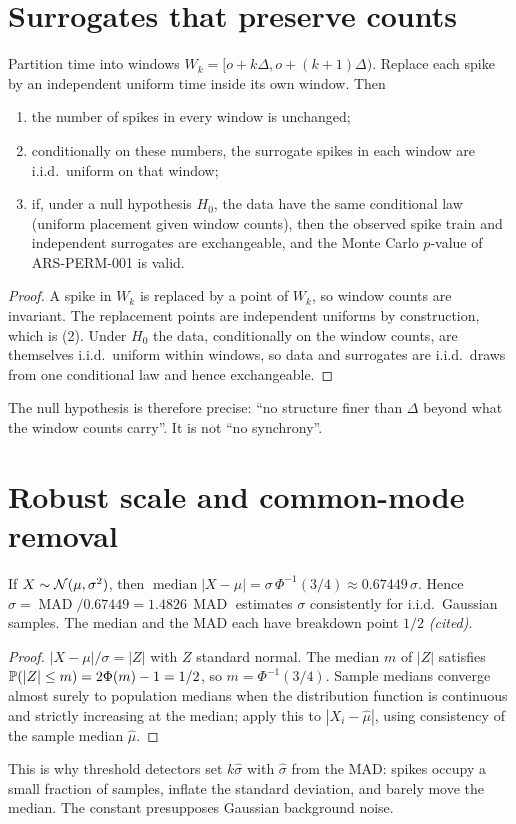 \section{Surrogates that preserve counts}
\begin{theorem}\label{ars:count-009}
Partition time into windows $W_k=[o+k\Delta,o+(k+1)\Delta)$. Replace each spike by an independent uniform time inside its own window. Then
\begin{enumerate}[leftmargin=2em]
\item the number of spikes in every window is unchanged;
\item conditionally on these numbers, the surrogate spikes in each window are i.i.d.\ uniform on that window;
\item if, under a null hypothesis $H_0$, the data have the same conditional law (uniform placement given window counts), then the observed spike train and independent surrogates are exchangeable, and the Monte Carlo $p$-value of ARS-PERM-001 is valid.
\end{enumerate}
\end{theorem}
\begin{proof}
A spike in $W_k$ is replaced by a point of $W_k$, so window counts are invariant. The replacement points are independent uniforms by construction, which is (2). Under $H_0$ the data, conditionally on the window counts, are themselves i.i.d.\ uniform within windows, so data and surrogates are i.i.d.\ draws from one conditional law and hence exchangeable.
\end{proof}
The null hypothesis is therefore precise: ``no structure finer than $\Delta$ beyond what the window counts carry''. It is not ``no synchrony''.

\section{Robust scale and common-mode removal}
\begin{theorem}\label{ars:rob-001}
If $X\sim\mathcal{N}(\mu,\sigma^2)$, then $\operatorname{median}|X-\mu|=\sigma\,\Phi^{-1}(3/4)\approx0.67449\,\sigma$. Hence $\hat\sigma=\operatorname{MAD}/0.67449=1.4826\,\operatorname{MAD}$ estimates $\sigma$ consistently for i.i.d.\ Gaussian samples. The median and the MAD each have breakdown point $1/2$ \emph{(cited)}.
\end{theorem}
\begin{proof}
$|X-\mu|/\sigma=|Z|$ with $Z$ standard normal. The median $m$ of $|Z|$ satisfies $\mathbb P(|Z|\le m)=2\Phi(m)-1=1/2$, so $m=\Phi^{-1}(3/4)$. Sample medians converge almost surely to population medians when the distribution function is continuous and strictly increasing at the median; apply this to $|X_i-\hat\mu|$, using consistency of the sample median $\hat\mu$.
\end{proof}
This is why threshold detectors set $k\hat\sigma$ with $\hat\sigma$ from the MAD: spikes occupy a small fraction of samples, inflate the standard deviation, and barely move the median. The constant presupposes Gaussian background noise.

